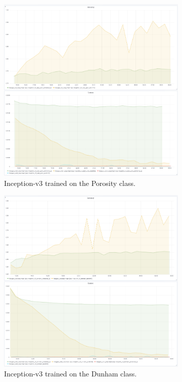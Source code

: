 \begin{figure}
\begin{subfigure}{.5\textwidth}
  \centering
  \includegraphics[width=.8\linewidth]{figures/04-go_poro_acc.PNG}
  \caption{Inception-v3 trained on the Porosity class.}
  \label{fig:googinit_poro}
\end{subfigure}%
\begin{subfigure}{.5\textwidth}
  \centering
  \includegraphics[width=.8\linewidth]{figures/04-go_dunham_acc.PNG}
  \caption{Inception-v3 trained on the Dunham class.}
  \label{fig:googinit_dunham}
\end{subfigure}
\begin{subfigure}{.5\textwidth}

\end{subfigure}
\end{figure}
